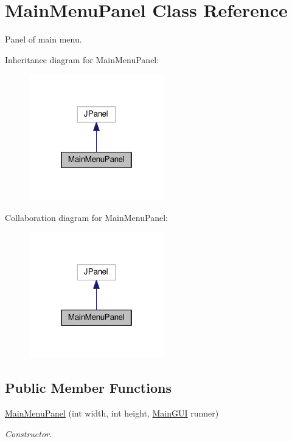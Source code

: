 \hypertarget{classMainMenuPanel}{}\section{Main\+Menu\+Panel Class Reference}
\label{classMainMenuPanel}


Panel of main menu.  




Inheritance diagram for Main\+Menu\+Panel\+:\nopagebreak
\begin{figure}[H]
\begin{center}
\leavevmode
\includegraphics[width=166pt]{classMainMenuPanel__inherit__graph}
\end{center}
\end{figure}


Collaboration diagram for Main\+Menu\+Panel\+:\nopagebreak
\begin{figure}[H]
\begin{center}
\leavevmode
\includegraphics[width=166pt]{classMainMenuPanel__coll__graph}
\end{center}
\end{figure}
\subsection*{Public Member Functions}
\begin{DoxyCompactItemize}
\item 
\hyperlink{classMainMenuPanel_a84d6e512c79963a1a77aaa48fa3c0211}{Main\+Menu\+Panel} (int width, int height, \hyperlink{classMainGUI}{Main\+G\+UI} runner)
\begin{DoxyCompactList}\small\item\em Constructor. \end{DoxyCompactList}\end{DoxyCompactItemize}
